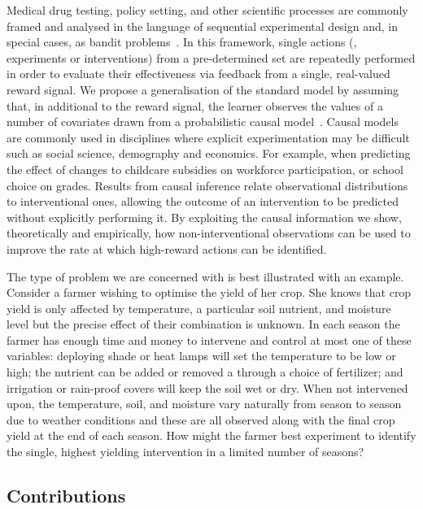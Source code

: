 Medical drug testing, policy setting, and other scientific processes are commonly framed and analysed in the language of sequential experimental design and, in special cases, as bandit problems~\citep{Robbins1952,Chernoff1959}. 
In this framework, single actions (\eg, experiments or interventions) from a pre-determined set are repeatedly performed in 
order to evaluate their effectiveness via feedback from a single, real-valued reward signal.
We propose a generalisation of the standard model by assuming that, in additional to the reward signal, the learner observes the values of a number of covariates 
drawn from a probabilistic causal model~\citep{Pearl2000}.
Causal models are commonly used in disciplines where explicit experimentation may be difficult such as social science, demography and economics.
For example, when predicting the effect of changes to childcare subsidies on workforce participation, or school choice on grades. 
Results from causal inference relate observational distributions to interventional ones, allowing the outcome of an intervention to be predicted without
explicitly performing it.
By exploiting the causal information we show, theoretically and empirically, how non-interventional observations can be used to improve the rate at 
which high-reward actions can be identified.

The type of problem we are concerned with is best illustrated with an example. 
Consider a farmer wishing to optimise the yield of her crop. 
She knows that crop yield is only affected by temperature, a particular soil nutrient, and moisture level but the precise effect of their combination is unknown.
In each season the farmer has enough time and money to intervene and control at most one of these variables:
deploying shade or heat lamps will set the temperature to be low or high; the nutrient can be added or removed a through a choice of fertilizer; and irrigation or rain-proof covers will keep the soil wet or dry.
When not intervened upon, the temperature, soil, and moisture vary naturally from season to season due to weather conditions and these are all observed along with the final crop yield at the end of each season.
How might the farmer best experiment to identify the single, highest yielding intervention in a limited number of seasons?


\subsection{Contributions}


